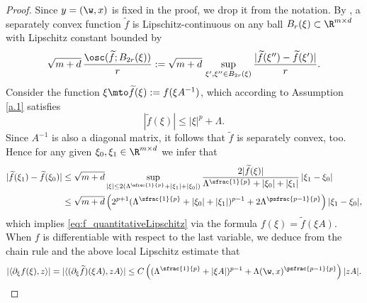 \begin{proof}
Since $y=(\w,x)$ is fixed in the proof, we drop it from the notation. By \cite[Th.\,4.36]{FoLe}, a separately convex function $\widetilde{f}$ is Lipschitz-continuous on any ball $B_r(\xi)\subset\R^{m\times d}$ with Lipschitz constant bounded by
\begin{equation*}
\sqrt{m+d}\,\frac{\osc (\widetilde{f};B_{2r}(\xi))}{r}:=\sqrt{m+d}\,\sup_{\xi',\xi''\in B_{2r}(\xi)}\frac{|\widetilde{f}(\xi'')-\widetilde{f}(\xi')|}{r}.
\end{equation*}
Consider the function $\xi\mto \widetilde{f}(\xi):=f(\xi A^{-1})$, which according to Assumption \ref{a.1} satisfies
\begin{equation*}
|\widetilde{f}(\xi)|\leq |\xi|^p+\Lambda.
\end{equation*}
Since $A^{-1}$ is also a diagonal matrix, it follows that $\widetilde{f}$ is separately convex, too. Hence for any given $\xi_0,\xi_1\in\R^{m\times d}$ we infer that
\begin{align*}
|\widetilde{f}(\xi_1)-\widetilde{f}(\xi_0)|&\leq\sqrt{m+d}\sup_{|\xi|\leq 2(\Lambda^{\sfrac{1}{p}}+|\xi_1|+|\xi_0|)} \frac{2|\widetilde{f}(\xi)|}{\Lambda^{\sfrac{1}{p}}+|\xi_0|+|\xi_1|}\,|\xi_1-\xi_0|
\\
&\leq \sqrt{m+d}\left(2^{p+1}(\Lambda^{\sfrac{1}{p}}+|\xi_0|+|\xi_1|)^{p-1}+2\Lambda^{\psfrac{p-1}{p}}\right)|\xi_1-\xi_0|,
\end{align*}
which implies \eqref{eq:f_quantitativeLipschitz} via the formula $f(\xi)=\widetilde{f}(\xi A)$. When $f$ is differentiable with respect to the last variable, we deduce from the chain rule and the above local Lipschitz estimate that
\begin{equation*}
|\langle \partial_{\xi}f(\xi),z\rangle|=|\langle (\partial_{\xi}\widetilde{f})(\xi A) ,zA\rangle|\nonumber
\leq C\left((\Lambda^{\sfrac{1}{p}}+|\xi A|)^{p-1}+\Lambda(\w,x)^{\psfrac{p-1}{p}}\right)|zA|.\qedhere
\end{equation*}
\end{proof}

